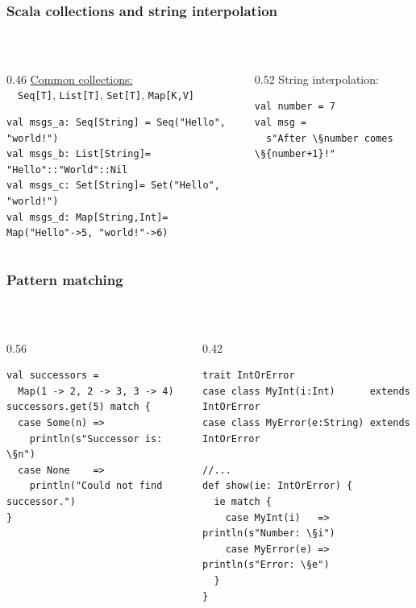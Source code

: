 \documentclass[aspectratio=169]{beamer}
\begin{document}
\begin{frame}[fragile]\frametitle{Scala collections and string interpolation}
~\\[-8mm]
\begin{columns}
\begin{column}{0.46\textwidth}
\href{https://docs.scala-lang.org/overviews/collections-2.13/performance-characteristics.html}{Common collections:}
\\~~\texttt{Seq[T]}, \texttt{List[T]}, \texttt{Set[T]}, \texttt{Map[K,V]}  
\begin{lstlisting}
val msgs_a: Seq[String] = Seq("Hello", "world!")
val msgs_b: List[String]= "Hello"::"World"::Nil
val msgs_c: Set[String]= Set("Hello", "world!")
val msgs_d: Map[String,Int]= Map("Hello"->5, "world!"->6)
\end{lstlisting}
\end{column}
\begin{column}{0.52\textwidth}
String interpolation:
\begin{lstlisting}
val number = 7
val msg =
  s"After \§number comes \§{number+1}!"
\end{lstlisting}
\end{column}
\end{columns}
\end{frame}


\begin{frame}[fragile]\frametitle{Pattern matching}
~\\[-8mm]
\begin{columns}
\begin{column}{0.56\textwidth}
\begin{lstlisting}
val successors =
  Map(1 -> 2, 2 -> 3, 3 -> 4)
successors.get(5) match {
  case Some(n) =>
    println(s"Successor is: \§n")
  case None    =>
    println("Could not find successor.")
}
\end{lstlisting}
\end{column}
\begin{column}{0.42\textwidth}
\begin{lstlisting}
trait IntOrError
case class MyInt(i:Int)      extends IntOrError
case class MyError(e:String) extends IntOrError

//...
def show(ie: IntOrError) {
  ie match {
    case MyInt(i)   => println(s"Number: \§i")
    case MyError(e) => println(s"Error: \§e")
  }
}
\end{lstlisting}
\end{column}
\end{columns}
\end{frame}
\end{document}
